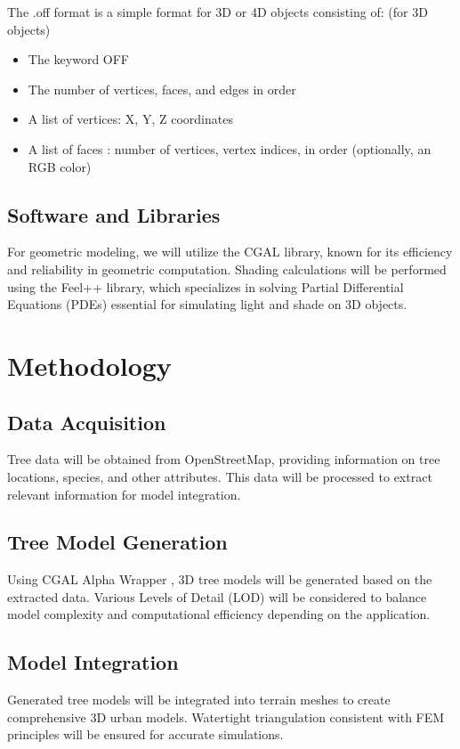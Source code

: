 \documentclass[12pt]{article}
\begin{document}
The .off format\cite{off_format} is a simple format for 3D or 4D objects consisting of: (for 3D objects)
\begin{itemize}
    \item The keyword OFF
    \item The number of vertices, faces, and edges in order 
    \item A list of vertices: X, Y, Z coordinates
    \item A list of faces : number of vertices, vertex indices, in order (optionally, an RGB color)
\end{itemize}

\subsection{Software and Libraries}
For geometric modeling, we will utilize the CGAL \cite{cgal} library, known for its efficiency and 
reliability in geometric computation. Shading calculations will be performed using the 
Feel++ \cite{feel++} library, which specializes in solving Partial Differential Equations (PDEs) 
essential for simulating light and shade on 3D objects.

\newpage

\section{Methodology}

\subsection{Data Acquisition}
Tree data will be obtained from OpenStreetMap, providing information on tree locations, 
species, and other attributes. This data will be processed to extract relevant 
information for model integration.

\subsection{Tree Model Generation}
Using CGAL Alpha Wrapper \cite{cgal_alpha_wrapper}, 3D tree models will be generated based on the extracted data. Various 
Levels of Detail (LOD) will be considered to balance model complexity and computational 
efficiency depending on the application.

\subsection{Model Integration}
Generated tree models will be integrated into terrain meshes to create comprehensive 
3D urban models. Watertight triangulation consistent with FEM principles will be ensured 
for accurate simulations.
\end{document}

